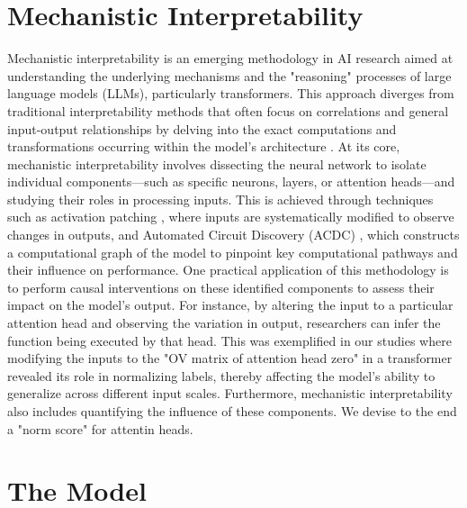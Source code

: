\documentclass{article}
\begin{document}
\section{Mechanistic Interpretability}
Mechanistic interpretability is an emerging methodology in AI research aimed at understanding the underlying mechanisms and the "reasoning" processes of large language models (LLMs), particularly transformers. This approach diverges from traditional interpretability methods that often focus on correlations and general input-output relationships by delving into the exact computations and transformations occurring within the model's architecture \citep{nanda_2023_progress}.
At its core, mechanistic interpretability involves dissecting the neural network to isolate individual components—such as specific neurons, layers, or attention heads—and studying their roles in processing inputs. This is achieved through techniques such as activation patching \citep{zhang_2023_towards}, where inputs are systematically modified to observe changes in outputs, and Automated Circuit Discovery (ACDC) \citep{conmy_2023_towards}, which constructs a computational graph of the model to pinpoint key computational pathways and their influence on performance.
One practical application of this methodology is to perform causal interventions on these identified components to assess their impact on the model's output. For instance, by altering the input to a particular attention head and observing the variation in output, researchers can infer the function being executed by that head. This was exemplified in our studies where modifying the inputs to the "OV matrix of attention head zero" in a transformer revealed its role in normalizing labels, thereby affecting the model’s ability to generalize across different input scales.
Furthermore, mechanistic interpretability also includes quantifying the influence of these components. We devise to the end a "norm score" for attentin heads.
\section{The Model}
\end{document}
